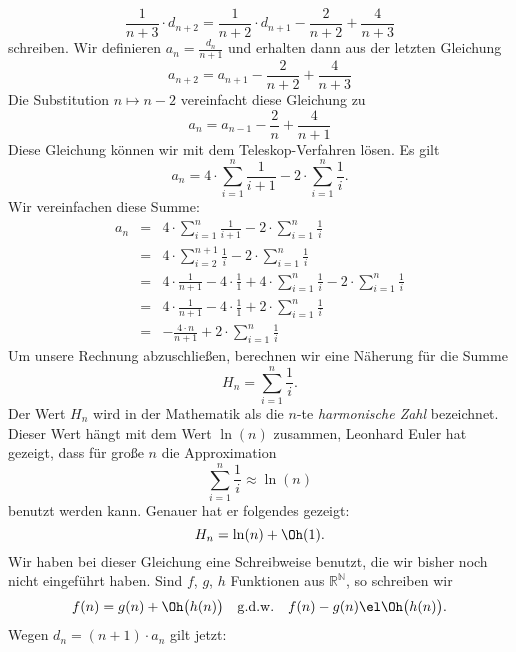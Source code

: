 \begin{equation}
  \label{eq:qs9}
 \frac{1}{n+3} \cdot d_{n+2} = \frac{1}{n+2}\cdot d_{n+1} - \frac{2}{n+2} + \frac{4}{n+3}  
\end{equation}
schreiben.  Wir definieren $\displaystyle a_n = \frac{d_n}{n+1}$ und erhalten dann aus der
letzten Gleichung 
\[ a_{n+2} = a_{n+1} - \frac{2}{n+2} + \frac{4}{n+3} \]
Die Substitution $n \mapsto n-2$ vereinfacht diese Gleichung zu 
\begin{equation}
  \label{eq:qs10}
 a_{n} = a_{n-1} - \frac{2}{n} + \frac{4}{n+1}  
\end{equation}
Diese Gleichung k\"onnen wir mit dem Teleskop-Verfahren l\"osen.  Es gilt 
\begin{equation}
  \label{eq:qs11}
 a_{n} = 4 \cdot \sum_{i=1}^n \frac{1}{i+1} - 2 \cdot \sum_{i=1}^n \frac{1}{i}.  
\end{equation}
Wir vereinfachen diese Summe:
\[
\begin{array}{lcl}
 a_{n} & = & \displaystyle 4 \cdot \sum_{i=1}^n \frac{1}{i+1} - 2 \cdot \sum_{i=1}^n \frac{1}{i} \\[0.5cm]
       & = & \displaystyle 4 \cdot \sum_{i=2}^{n+1} \frac{1}{i} - 2 \cdot \sum_{i=1}^n \frac{1}{i} \\[0.5cm]
       & = & \displaystyle 4 \cdot \frac{1}{n+1} - 4 \cdot \frac{1}{1} + 4 \cdot \sum_{i=1}^{n} \frac{1}{i} - 2 \cdot \sum_{i=1}^n \frac{1}{i} \\[0.5cm]
       & = & \displaystyle 4 \cdot \frac{1}{n+1} - 4 \cdot \frac{1}{1} + 2 \cdot \sum_{i=1}^{n} \frac{1}{i}  \\[0.5cm]
       & = & \displaystyle - \frac{4 \cdot n}{n+1}  + 2 \cdot \sum_{i=1}^{n} \frac{1}{i}  
\end{array}
\]
Um unsere Rechnung abzuschlie\ss{}en, berechnen wir eine N\"aherung f\"ur die Summe 
\[ H_n = \sum\limits_{i=1}^{n}\frac{1}{i}.\]
Der Wert $H_n$ wird in der Mathematik als die $n$-te \emph{harmonische Zahl} bezeichnet.
Dieser Wert h\"angt mit dem Wert $\ln(n)$ zusammen, Leonhard Euler hat gezeigt, dass f\"ur
gro\ss{}e $n$ die Approximation
\[ \sum\limits_{i=1}^n \frac{1}{i} \approx \ln(n)  \]
benutzt werden kann.  Genauer hat er folgendes gezeigt:
\[ H_n = \ln(n) + \Oh(1). \]
Wir haben bei dieser Gleichung eine Schreibweise benutzt, die wir bisher noch nicht
eingef\"uhrt haben.  Sind $f$, $g$, $h$ Funktionen aus $\mathbb{R}^\mathbb{N}$, so schreiben
wir 
\[ f(n) = g(n) + \Oh\bigl(h(n)\bigr) \quad \mathrm{g.d.w.} \quad
   f(n) - g(n) \el \Oh\bigl(h(n)\bigr). 
\]
Wegen $d_n = (n+1) \cdot a_{n}$ gilt jetzt: 
